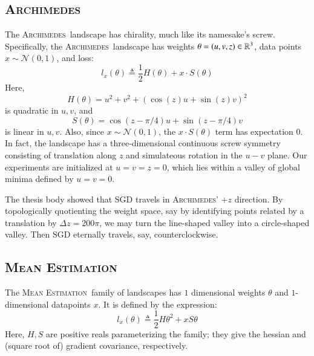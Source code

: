 \documentclass[openany, notitlepage, justified]{tufte-book}
\theoremstyle{plain}
\theoremstyle{definition}
\newcommand{\Nn}{\mathcal{N}}   \newcommand{\NN}{\mathbb{N}}
\newcommand{\Archimedes}{\textsc{Archimedes}}
\newcommand{\MeanEstimation}{\textsc{Mean Estimation}}
\begin{document}
        \subsection{\Archimedes}
            The \Archimedes\, landscape has chirality, much like its namesake's
            screw.\cite{vi00}  Specifically, the \Archimedes\ landscape has
            weights     $\theta = (u,v,z) \in \mathbb{R}^3$,
            data points $x \sim \Nn(0, 1)$,
            and loss:
            $$
                l_x(\theta)
                \triangleq
                \frac{1}{2} H(\theta) + x \cdot S(\theta)
            $$
            Here,
            $$
                H(\theta) = u^2 + v^2 + (\cos(z) u + \sin(z) v)^2
            $$
            is quadratic in $u, v$, and
            $$
                S(\theta) = \cos(z-\pi/4) u + \sin(z-\pi/4) v
            $$
            is linear in $u, v$.
            Also, since $x \sim \Nn(0,1)$, the $x \cdot S(\theta)$ term has
            expectation $0$.
            In fact, the landscape has a three-dimensional continuous screw
            symmetry consisting of translation along $z$ and simulateous
            rotation in the $u-v$ plane.  Our experiments are initialized at
            $u=v=z=0$, which lies within a valley of global minima defined by
            $u=v=0$.  

            The thesis body showed that SGD travels in \Archimedes' $+z$
            direction.  By topologically quotienting the weight space, say by
            identifying points related by a translation by $\Delta z = 200\pi$,
            we may turn the line-shaped valley into a circle-shaped valley.
            Then SGD eternally travels, say, counterclockwise.
           
        \subsection{\MeanEstimation}
            The \MeanEstimation\, family of landscapes has $1$ dimensional
            weights $\theta$ and $1$-dimensional datapoints $x$.  It is defined
            by the expression:
            $$
                l_x(\theta)
                \triangleq
                \frac{1}{2} H \theta^2 + x S \theta
            $$
            Here, $H, S$ are positive reals parameterizing the family; they
            give the hessian and (square root of) gradient covariance,
            respectively.
\end{document}
